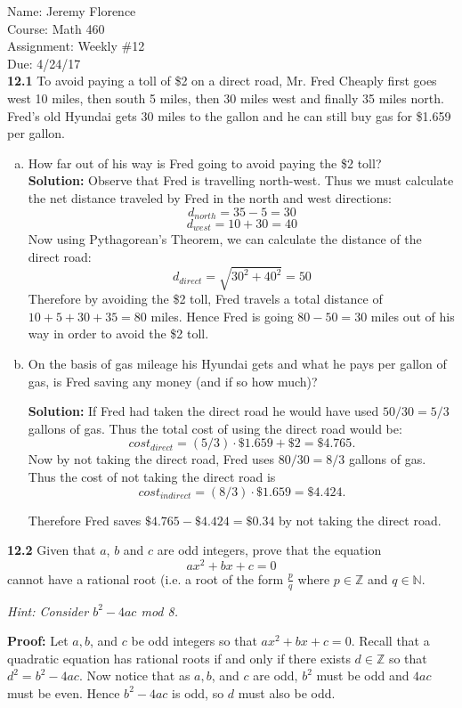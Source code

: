 \documentclass{article}
\newcommand\TheSolution{%
  \textbf{Solution:} %
}
\newcommand\Proof{%
	\textbf{Proof:} %
}
\begin{document}
Name: Jeremy Florence\\
Course: Math 460\\
Assignment: Weekly \#12\\
Due: 4/24/17\\

\textbf{12.1} To avoid paying a toll of \$2 on a direct road, Mr. Fred Cheaply first goes west 10 miles, then south 5 miles, then 30 miles west and finally 35 miles north. Fred’s old Hyundai gets 30 miles to the
gallon and he can still buy gas for \$1.659 per gallon.

\begin{enumerate}[(a)]
\item How far out of his way is Fred going to avoid paying the \$2 toll?\\

\TheSolution Observe that Fred is travelling north-west. Thus we must calculate the net distance traveled by Fred in the north and west directions:
		$$d_{north}=35-5=30$$
		$$d_{west}=10+30=40$$
Now using Pythagorean's Theorem, we can calculate the distance of the direct road:
		$$d_{direct}=\sqrt{30^2+40^2}=50$$
Therefore by avoiding the \$2 toll, Fred travels a total distance of $10+5+30+35=80$ miles. Hence Fred is going $80-50=30$ miles out of his way in order to avoid the \$2 toll.
\item On the basis of gas mileage his Hyundai gets and what he pays per gallon of gas, is Fred saving any money (and if so how much)?

\TheSolution If Fred had taken the direct road he would have used $50/30=5/3$ gallons of gas. Thus the total cost of using the direct road would be:
		$$cost_{direct}=(5/3) \cdot \$1.659+\$2=\$4.765.$$
Now by not taking the direct road, Fred uses $80/30=8/3$ gallons of gas. Thus the cost of not taking the direct road is $$cost_{indirect}=(8/3) \cdot \$1.659=\$4.424.$$

Therefore Fred saves $\$4.765-\$4.424=\$0.34$ by not taking the direct road.

\end{enumerate}

\textbf{12.2} Given that $a$, $b$ and $c$ are odd integers, prove that the equation
										$$ax^2+bx+c=0$$
cannot have a rational root (i.e. a root of the form $\frac{p}{q}$ where $p \in \mathbb{Z}$ and $q \in \mathbb{N}$.

\emph{Hint: Consider $b^2-4ac$ mod 8.}

\Proof Let $a,b$, and $c$ be odd integers so that $ax^2+bx+c=0$. Recall that a quadratic equation has rational roots if and only if there exists $d \in \mathbb{Z}$ so that $d^2=b^2-4ac$. Now notice that as $a,b$, and $c$ are odd, $b^2$ must be odd and $4ac$ must be even. Hence $b^2-4ac$ is odd, so $d$ must also be odd.
\end{document}
